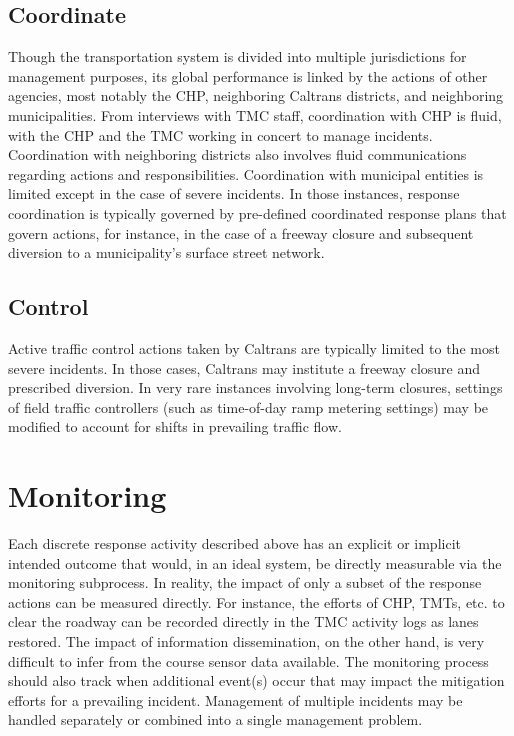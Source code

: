 \documentclass[12pt]{report}
\newcounter{time}
\begin{document}
\subsection{Coordinate}
\label{sec:coordinate}

Though the transportation system is divided into multiple jurisdictions for
management purposes, its global performance is linked by the actions of other
agencies, most notably the \ac{CHP}, neighboring Caltrans districts, and
neighboring municipalities.  From interviews with \ac{TMC} staff, coordination
with \ac{CHP} is fluid, with the \ac{CHP} and the \ac{TMC} working in concert to
manage incidents.  Coordination with neighboring districts also involves fluid
communications regarding actions and responsibilities.  Coordination with
municipal entities is limited except in the case of severe incidents.  In those
instances, response coordination is typically governed by pre-defined
coordinated response plans that govern actions, for instance, in the case of a
freeway closure and subsequent diversion to a municipality's surface street
network.


\subsection{Control}
\label{sec:control}

Active traffic control actions taken by Caltrans are typically limited to the
most severe incidents.  In those cases, Caltrans may institute a freeway closure
and prescribed diversion.  In very rare instances involving long-term closures,
settings of field traffic controllers (such as time-of-day ramp metering
settings) may be modified to account for shifts in prevailing traffic flow.


\section{Monitoring}
\label{sec:monitoring}

Each discrete response activity described above has an explicit or implicit
intended outcome that would, in an ideal system, be directly measurable via the
monitoring subprocess.  In reality, the impact of only a subset of the response
actions can be measured directly.  For instance, the efforts of \ac{CHP},
\acp{TMT}, etc. to clear the roadway can be recorded directly in the \ac{TMC}
activity logs as lanes restored.  The impact of information dissemination, on
the other hand, is very difficult to infer from the course sensor data
available.  The monitoring process should also track when additional event(s)
occur that may impact the mitigation efforts for a prevailing incident.
Management of multiple incidents may be handled separately or combined into a
single management problem.
\end{document}
